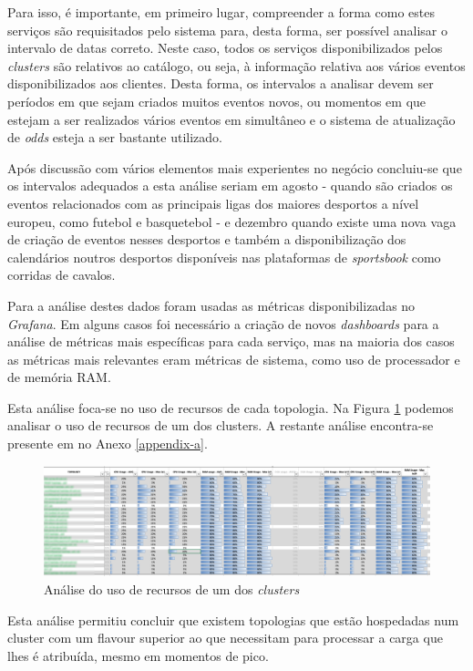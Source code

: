 Para isso, é importante, em primeiro lugar, compreender a forma como estes serviços são requisitados
pelo sistema para, desta forma, ser possível analisar o intervalo de datas correto. Neste caso,
todos os serviços disponibilizados pelos \textit{\glspl{cluster}} são relativos ao catálogo, ou seja,
à informação relativa aos vários eventos disponibilizados aos clientes. Desta forma, os intervalos
a analisar devem ser períodos em que sejam criados muitos eventos novos, ou momentos em que
estejam a ser realizados vários eventos em simultâneo e o sistema de atualização de \textit{\glspl{odd}}
esteja a ser bastante utilizado.

Após discussão com vários elementos mais experientes no negócio concluiu-se que os intervalos
adequados a esta análise seriam em agosto - quando são criados os eventos relacionados com as
principais ligas dos maiores desportos a nível europeu, como futebol e basquetebol - e dezembro 
quando existe uma nova vaga de criação de eventos nesses desportos e também a disponibilização 
dos calendários noutros desportos disponíveis nas plataformas de \textit{sportsbook} como
corridas de cavalos.

Para a análise destes dados foram usadas as métricas disponibilizadas no \textit{Grafana}. Em alguns
casos foi necessário a criação de novos \textit{dashboards} para a análise de métricas mais 
específicas para cada serviço, mas na maioria dos casos as métricas mais relevantes eram métricas 
de sistema, como uso de processador e de memória RAM.

Esta análise foca-se no uso de recursos de cada topologia. Na Figura \ref{analise-ofs} podemos
analisar o uso de recursos de um dos \glspl{cluster}. A restante análise encontra-se
presente em no Anexo \ref{appendix-a}.

\begin{figure}[H]
  \centerline{\includegraphics[scale=0.3]{media/content/analise/analise-ofs.png}}
  \caption{Análise do uso de recursos de um dos \textit{clusters}}
  \label{analise-ofs}
\end{figure}

Esta análise permitiu concluir que existem topologias que estão hospedadas num \gls{cluster}
com um \gls{flavour} superior ao que necessitam para processar a carga que lhes é atribuída,
mesmo em momentos de pico. 

